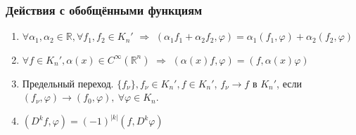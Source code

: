 \documentclass[9pt, a4paper]{article}
\begin{document}
		\subsubsection{Действия с обобщёнными функциям}
			\begin{enumerate}
				\item $\forall \alpha_1, \alpha_2 \in \mathbb{R}, \forall f_1, f_2 \in K_n'$ $\Rightarrow$ $(\alpha_1 f_1 + \alpha_2 f_2, \varphi) = \alpha_1(f_1, \varphi) + \alpha_2(f_2, \varphi)$
				\item $\forall f \in K_n', \alpha(x) \in C^\infty(\mathbb{R}^n)$ $\Rightarrow$ $(\alpha(x)f, \varphi) = (f, \alpha(x) \varphi)$
				\item Предельный переход. $\{f_\nu\}, f_\nu \in K_n', f \in K_n'$, $f_\nu \to f$ в $K_n'$, если $(f_\nu, \varphi) \to (f_0, \varphi), \ \forall \varphi \in K_n$. 
				\item $(D^kf, \varphi) = (-1)^{|k|} (f, D^k\varphi)$
			\end{enumerate}
\end{document}
